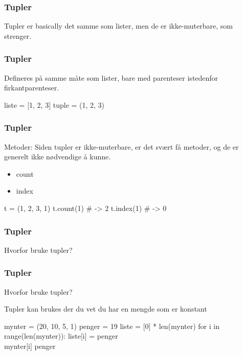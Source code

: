 
\begin{frame}
    \frametitle{Tupler}

    Tupler er basically det samme som lister, men de er ikke-muterbare, som strenger. 

\end{frame}

\begin{frame}[fragile]
    \frametitle{Tupler}

    Defineres på samme måte som lister, bare med parenteser istedenfor firkantparenteser.

\begin{python}
liste = [1, 2, 3]
tuple = (1, 2, 3)
\end{python}

\end{frame}

\begin{frame}[fragile]
    \frametitle{Tupler}

    Metoder: Siden tupler er ikke-muterbare, er det svært få metoder, og de er generelt ikke nødvendige å kunne. 

    \begin{itemize}
        \item count
        \item index
    \end{itemize}

\begin{python}
t = (1, 2, 3, 1)
t.count(1) # -> 2
t.index(1) # -> 0
\end{python}

\end{frame}

\begin{frame}
    \frametitle{Tupler}

    Hvorfor bruke tupler? 

\end{frame}


\begin{frame}[fragile]
    \frametitle{Tupler}

    Hvorfor bruke tupler? 

    Tupler kan brukes der du vet du har en mengde som er konstant

\begin{python}
mynter = (20, 10, 5, 1)
penger = 19
liste  = [0] * len(mynter)
for i in range(len(mynter)): 
    liste[i] = penger \\ mynter[i]
    penger  %
\end{python}

\end{frame}

